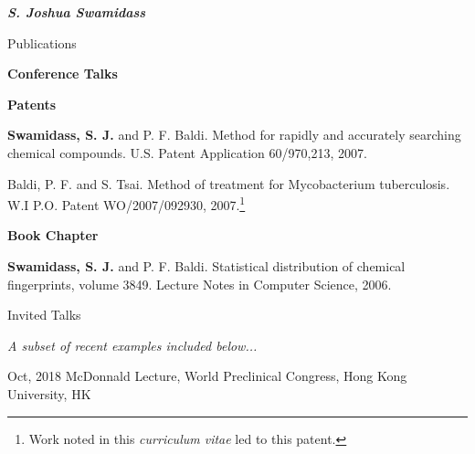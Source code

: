 \documentclass[10pt]{article}
\begin{document}
\begin{cv}{\huge \it \bfseries S. Joshua Swamidass}
\begin{cvlist}{Publications}
\item {\bf Conference Talks}

\item{ }


\pagebreak[2]
\item {\bf Patents} 
\item{\begin{etaremune}
\setlength{\topsep}{0em}\setlength{\labelsep}{.5em}
\item {\bf Swamidass, S. J.} and P. F. Baldi. Method for rapidly and accurately searching chemical compounds. U.S. Patent Application 60/970,213, 2007. 
\item Baldi, P. F. and S. Tsai. Method of treatment for Mycobacterium tuberculosis. W.I P.O. Patent WO/2007/092930, 2007.\footnote{Work noted in this \emph{curriculum vitae} led to this patent.}
\end{etaremune}}
\pagebreak[2]
\item {\bf Book Chapter } 
\item{\begin{etaremune}
\setlength{\topsep}{0em}\setlength{\labelsep}{.5em}
\item {\bf Swamidass, S. J.} and  P. F.  Baldi. Statistical distribution of chemical fingerprints, volume 3849. Lecture Notes in Computer Science, 2006. 
\end{etaremune}}
\end{cvlist}

\settowidth{\cvlabelwidth}{\cvlabelfont 2009-2009}%
\setlength{\cvlabelsep}{1em}

\pagebreak[2]

\begin{cvlist}{ Invited Talks}
\item \emph{A subset of recent examples included below...}
\item[Oct, 2018] McDonnald Lecture, World Preclinical Congress, Hong Kong University, HK


\end{cvlist}
\end{cv}
\end{document}
